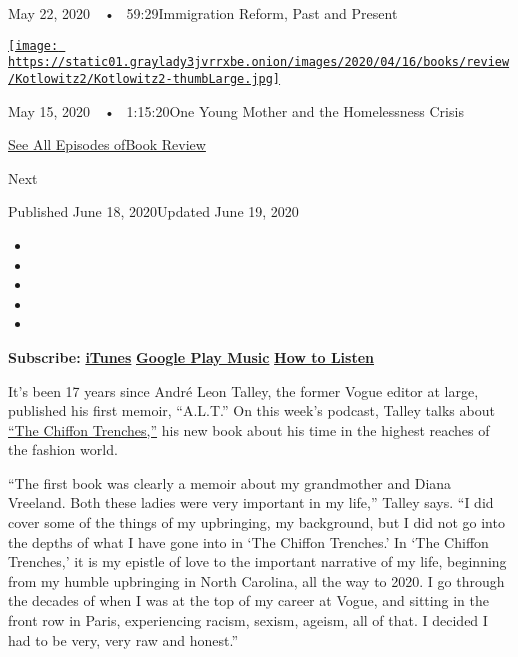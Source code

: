 May 22, 2020~~•~ 59:29Immigration Reform, Past and Present

\href{https://www.nytimes3xbfgragh.onion/2020/05/15/books/review/podcast-lauren-sandler-this-is-all-i-got-sarah-weinman-crime-fiction.html?action=click\&module=audio-series-bar\&region=header\&pgtype=Article}{\texttt{[image: https://static01.graylady3jvrrxbe.onion/images/2020/04/16/books/review/Kotlowitz2/Kotlowitz2-thumbLarge.jpg]}}

May 15, 2020~~•~ 1:15:20One Young Mother and the Homelessness Crisis

\href{https://www.nytimes3xbfgragh.onion/column/book-review-podcast}{See
All Episodes ofBook Review}

Next

Published June 18, 2020Updated June 19, 2020

\begin{itemize}
\item
\item
\item
\item
\item
\end{itemize}

\textbf{Subscribe:}
\textbf{\href{https://itunes.apple.com/us/podcast/book-review/id120315179?mt=2}{iTunes}}
\textbf{\textbar{}}
\textbf{\href{https://play.google.com/music/listen?u=0\#/ps/Iv6zeb5qwjtzjfbyo3vy5zny5ky}{Google
Play Music}} \textbf{\textbar{}}
\textbf{\href{https://www.nytimes3xbfgragh.onion/2018/08/03/books/review/how-to-listen-to-the-book-review-podcast.html}{How
to Listen}}

It's been 17 years since André Leon Talley, the former Vogue editor at
large, published his first memoir, ``A.L.T.'' On this week's podcast,
Talley talks about
\href{https://www.nytimes3xbfgragh.onion/2020/05/15/books/review/the-chiffon-trenches-andre-leon-talley.html}{``The
Chiffon Trenches,''} his new book about his time in the highest reaches
of the fashion world.

``The first book was clearly a memoir about my grandmother and Diana
Vreeland. Both these ladies were very important in my life,'' Talley
says. ``I did cover some of the things of my upbringing, my background,
but I did not go into the depths of what I have gone into in `The
Chiffon Trenches.' In `The Chiffon Trenches,' it is my epistle of love
to the important narrative of my life, beginning from my humble
upbringing in North Carolina, all the way to 2020. I go through the
decades of when I was at the top of my career at Vogue, and sitting in
the front row in Paris, experiencing racism, sexism, ageism, all of
that. I decided I had to be very, very raw and honest.''

